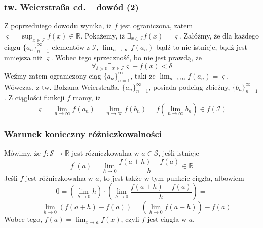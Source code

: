 \documentclass[11pt]{beamer}
\newcommand{\below}[1]{\displaystyle\mathop{#1}}
\begin{document}
\begin{frame}
\frametitle{tw. Weierstraßa cd. -- dowód (2)}
Z poprzedniego dowodu wynika, iż $f$ jest ograniczona, zatem $\varsigma = \sup_{x\in \mathcal{I}} f(x) \in \mathbb{R}$. Pokażemy, iż $\exists_{x\in \mathcal{I}}f(x) = \varsigma$. Załóżmy, że dla każdego ciągu $\{a_n\}_{n=1}^{\infty}$ elementów z $\mathcal{I}$, $\lim_{n \rightarrow \infty}f(a_n)$ bądź to nie istnieje, bądź jest mniejsza niż $\varsigma$. Wobec tego sprzeczność, bo nie jest prawdą, że
\[
	\below{\forall}_{\delta > 0}\below{\exists}_{x\in \mathcal{I}} \varsigma -f(x) < \delta
\]
Weźmy zatem ograniczony ciąg $\{a_n\}_{n=1}^{\infty}$, taki że $\lim_{n \rightarrow \infty}f(a_n) = \varsigma$. Wówczas, z tw. Bolzana-Weierstraßa, $\{a_n\}_{n=1}^{\infty}$, posiada podciąg zbieżny, $\{b_n\}_{n=1}^{\infty}$. Z ciągłości funkcji $f$ mamy, iż
\[
\varsigma = \below{\lim}_{n \rightarrow \infty}f(a_n) = \below{\lim}_{n\rightarrow \infty}f(b_n) = f(\below{\lim}_{n \rightarrow \infty}b_n) \in f(\mathcal{I})
\]
\end{frame}
\begin{frame}
\frametitle{Warunek konieczny różniczkowalności}
Mówimy, że $f:\mathcal{S} \rightarrow \mathbb{R}$ jest różniczkowalna w $a \in \mathcal{S}$, jeśli istnieje
\[
f^\prime(a) = \below{\lim}_{h \rightarrow 0} \frac{f(a + h) - f(a)}h \in \mathbb{R}
\]
Jeśli $f$ jest różniczkowalna w $a$, to jest także w tym punkcie ciągła, albowiem
\[
0 = \left( \below{\lim}_{h \rightarrow 0} h\right) \cdot \left(\below{\lim}_{h \rightarrow 0} \frac{f(a + h) - f(a)}h \right) =
\]
\[
= \below{\lim}_{h \rightarrow 0} \left( f(a + h) - f(a) \right) = \left(\below{\lim}_{h \rightarrow 0} f(a+h) \right) - f(a)
\]
Wobec tego, $f(a) = \lim_{x \rightarrow a}f(x)$, czyli $f$ jest ciągła w $a$.

\end{frame}
\end{document}
